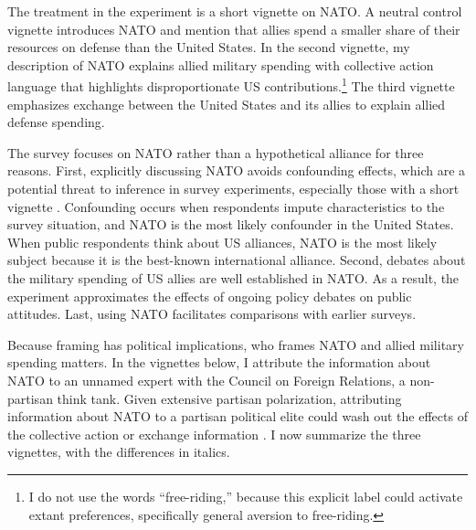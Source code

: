 \documentclass[12pt]{article}
\begin{document}
The treatment in the experiment is a short vignette on NATO. 
A neutral control vignette introduces NATO and mention that allies spend a smaller share of their resources on defense than the United States. 
In the second vignette, my description of NATO explains allied military spending with collective action language that highlights disproportionate US contributions.\footnote{I do not use the words ``free-riding,'' because this explicit label could activate extant preferences, specifically general aversion to free-riding.} 
The third vignette emphasizes exchange between the United States and its allies to explain allied defense spending. 


The survey focuses on NATO rather than a hypothetical alliance for three reasons. 
First, explicitly discussing NATO avoids confounding effects, which are a potential threat to inference in survey experiments, especially those with a short vignette \citep{KrepsRoblin2019}. 
Confounding occurs when respondents impute characteristics to the survey situation, and NATO is the most likely confounder in the United States. 
When public respondents think about US alliances, NATO is the most likely subject because it is the best-known international alliance.
Second, debates about the military spending of US allies are well established in NATO. 
As a result, the experiment approximates the effects of ongoing policy debates on public attitudes. 
Last, using NATO facilitates comparisons with earlier surveys.
 

Because framing has political implications, who frames NATO and allied military spending matters. 
In the vignettes below, I attribute the information about NATO to an unnamed expert with the Council on Foreign Relations, a non-partisan think tank. 
Given extensive partisan polarization, attributing information about NATO to a partisan political elite could wash out the effects of the collective action or exchange information \citep{Druckmanetal2013}. 
I now summarize the three vignettes, with the differences in italics. 
 
\end{document}
